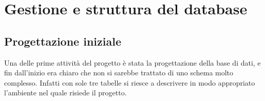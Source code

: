 \chapter{Gestione e struttura del database}

\section{Progettazione iniziale}
Una delle prime attività del progetto è stata la progettazione della base di
dati, e fin dall'inizio era chiaro che non si sarebbe trattato di uno schema
molto complesso. Infatti con sole tre tabelle si riesce a descrivere in modo
appropriato l'ambiente nel quale risiede il progetto.
